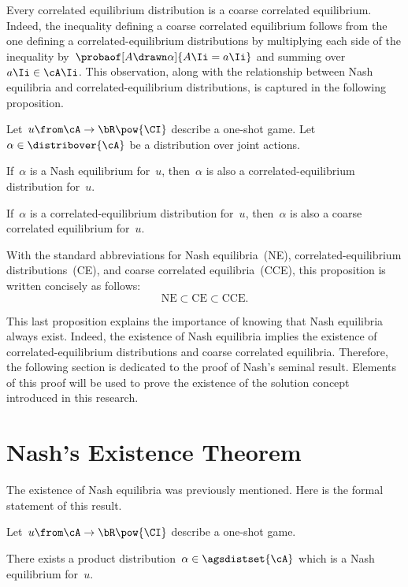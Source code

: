 Every correlated equilibrium distribution is a coarse correlated equilibrium.
Indeed, the inequality defining a coarse correlated equilibrium follows from the one defining a correlated-equilibrium distributions by multiplying each side of the inequality by~\(\probaof[A \drawn \alpha]{A\Ii = a\Ii}\) and summing over~\(a\Ii \in \cA\Ii\).
This observation, along with the relationship between Nash equilibria and correlated-equilibrium distributions, is captured in the following proposition.

\begin{proposition}
Let~\(u \from \cA \to \bR\pow{\CI}\) describe a one-shot game.
Let~\(\alpha \in \distribover{\cA}\) be a distribution over joint actions.

If~\(\alpha\) is a Nash equilibrium for~\(u\), then~\(\alpha\) is also a correlated-equilibrium distribution for~\(u\).

If~\(\alpha\) is a correlated-equilibrium distribution for~\(u\), then~\(\alpha\) is also a coarse correlated equilibrium for~\(u\).

With the standard abbreviations for Nash equilibria~(NE), correlated-equilibrium distributions~(CE), and coarse correlated equilibria~(CCE), this proposition is written concisely as follows:
\[
\mathrm{NE} \subset \mathrm{CE} \subset \mathrm{CCE}.
\]
\end{proposition}

This last proposition explains the importance of knowing that Nash equilibria always exist.
Indeed, the existence of Nash equilibria implies the existence of correlated-equilibrium distributions and coarse correlated equilibria.
Therefore, the following section is dedicated to the proof of Nash's seminal result.
Elements of this proof will be used to prove the existence of the solution concept introduced in this research.

\section{Nash's Existence Theorem}
\label{sec:nash_existence_theorem}

The existence of Nash equilibria was previously mentioned.
Here is the formal statement of this result.

\begin{theorem}
\label{res:nash_existence}
Let~\(u \from \cA \to \bR\pow{\CI}\) describe a one-shot game.

There exists a product distribution~\(\alpha \in \agsdistset{\cA}\) which is a Nash equilibrium for~\(u\).
\end{theorem}

